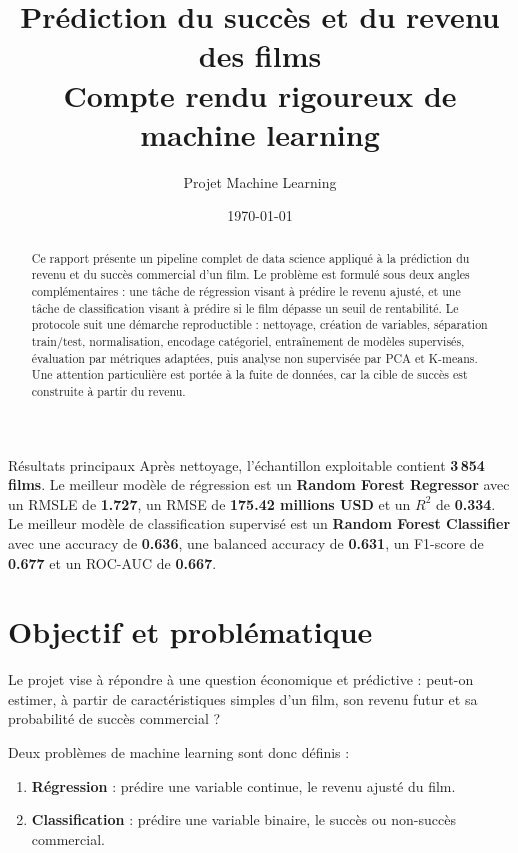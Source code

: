 \documentclass[11pt,a4paper]{article}
\title{\textbf{Prédiction du succès et du revenu des films}\\
\large Compte rendu rigoureux de machine learning}
\author{Projet Machine Learning}
\date{\today}
\begin{document}
\maketitle
\thispagestyle{empty}

\begin{abstract}
Ce rapport présente un pipeline complet de data science appliqué à la prédiction du revenu et du succès commercial d'un film. Le problème est formulé sous deux angles complémentaires : une tâche de régression visant à prédire le revenu ajusté, et une tâche de classification visant à prédire si le film dépasse un seuil de rentabilité. Le protocole suit une démarche reproductible : nettoyage, création de variables, séparation train/test, normalisation, encodage catégoriel, entraînement de modèles supervisés, évaluation par métriques adaptées, puis analyse non supervisée par PCA et K-means. Une attention particulière est portée à la fuite de données, car la cible de succès est construite à partir du revenu.
\end{abstract}

\begin{resultbox}{Résultats principaux}
Après nettoyage, l'échantillon exploitable contient \textbf{3\,854 films}. Le meilleur modèle de régression est un \textbf{Random Forest Regressor} avec un RMSLE de \textbf{1.727}, un RMSE de \textbf{175.42 millions USD} et un $R^2$ de \textbf{0.334}. Le meilleur modèle de classification supervisé est un \textbf{Random Forest Classifier} avec une accuracy de \textbf{0.636}, une balanced accuracy de \textbf{0.631}, un F1-score de \textbf{0.677} et un ROC-AUC de \textbf{0.667}.
\end{resultbox}

\tableofcontents
\newpage

\section{Objectif et problématique}

Le projet vise à répondre à une question économique et prédictive : peut-on estimer, à partir de caractéristiques simples d'un film, son revenu futur et sa probabilité de succès commercial ?

Deux problèmes de machine learning sont donc définis :
\begin{enumerate}
    \item \textbf{Régression} : prédire une variable continue, le revenu ajusté du film.
    \item \textbf{Classification} : prédire une variable binaire, le succès ou non-succès commercial.
\end{enumerate}
\end{document}
